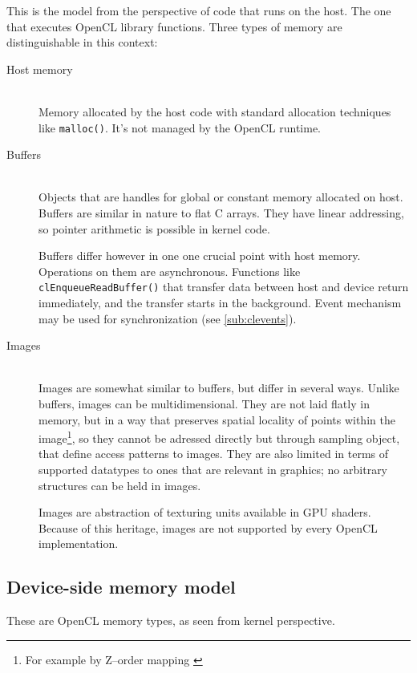 This is the model from the perspective of code that runs on the host. The one
that executes OpenCL library functions. Three types of memory are distinguishable
in this context:

\begin{description}
  \item[Host memory] \hfill \\
    Memory allocated by the host code with standard allocation techniques
    like \texttt{malloc()}. It's not managed by the OpenCL runtime.
  \item[Buffers] \hfill \\
    Objects that are handles for global or constant memory allocated on host.
    Buffers are similar in nature to flat C arrays. They have linear addressing,
    so pointer arithmetic is possible in kernel code.

    Buffers differ however in one one crucial point with host memory. Operations
    on them are asynchronous. Functions like \texttt{clEnqueue\-Read\-Buffer()} that
    transfer data between host and device return immediately, and the transfer
    starts in the background. Event mechanism may be used for synchronization
    (see \autoref{sub:clevents}).
  \item[Images] \hfill \\
    Images are somewhat similar to buffers, but differ in several ways.
    Unlike buffers, images can be multidimensional. They are not laid flatly in
    memory, but in a way that preserves spatial locality of points within the
    image\footnote{For example by Z--order mapping \parencite[p. 111-113]{gaster2012heterogeneous}},
    so they cannot be adressed directly but through sampling object, that define
    access patterns to images. They are also limited in terms of supported
    datatypes to ones that are relevant in graphics; no arbitrary structures can
    be held in images.

    Images are abstraction of texturing units available in GPU shaders. Because
    of this heritage, images are not supported by every OpenCL implementation.

\end{description}

\subsection{Device-side memory model}

These are OpenCL memory types, as seen from kernel perspective.

